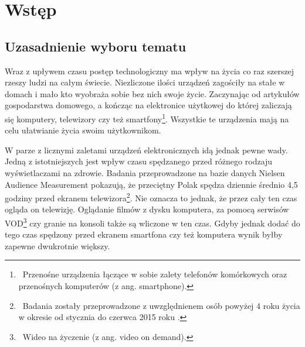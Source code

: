 \documentclass[12pt]{report}
\begin{document}
\lstset{aboveskip=20pt,belowskip=20pt}





\tableofcontents

\chapter{Wstęp}

\section{Uzasadnienie wyboru tematu}

Wraz z upływem czasu postęp technologiczny ma wpływ na życia co raz szerszej rzeszy ludzi na całym świecie. Niezliczone ilości urządzeń zagościły na stałe w domach i mało kto wyobraża sobie bez nich swoje życie. Zaczynając od artykułów gospodarstwa domowego, a kończąc na elektronice użytkowej do której zaliczają się komputery, telewizory czy też smartfony\footnote{~Przenośne urządzenia łączące w sobie zalety telefonów komórkowych oraz przenośnych komputerów (z ang. smartphone).}. Wszystkie te urządzenia mają na celu ułatwianie życia swoim użytkownikom.

W parze z licznymi zaletami urządzeń elektronicznych idą jednak pewne wady. Jedną z istotniejszych jest wpływ czasu spędzanego przed różnego rodzaju wyświetlaczami na zdrowie. Badania przeprowadzone na bazie danych Nielsen Audience Measurement pokazują, że przeciętny Polak spędza dziennie średnio 4,5 godziny przed ekranem telewizora\footnote{~Badania zostały przeprowadzone z uwzględnienem osób powyżej 4 roku życia w okresie od stycznia do czerwca 2015 roku \cite{czasprzedtv}.}. Nie oznacza to jednak, że przez cały ten czas ogląda on telewizję. Oglądanie filmów z dysku komputera, za pomocą serwisów VOD\footnote{~Wideo na życzenie (z ang. video on demand).} czy granie na konsoli także są wliczone w ten czas. Gdyby jednak dodać do tego czas spędzony przed ekranem smartfona czy też komputera wynik byłby zapewne dwukrotnie większy.
\end{document}
